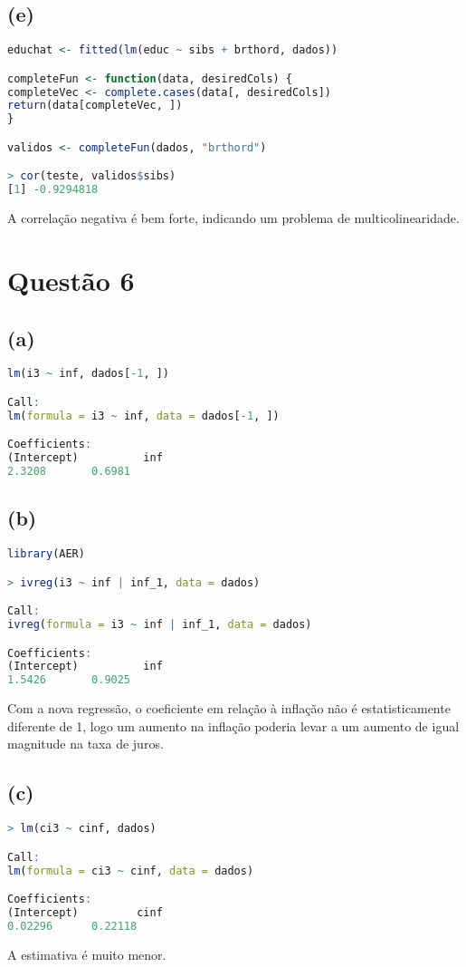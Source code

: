 \documentclass[12pt]{article}
\begin{document}
\subsection*{(e)}
\begin{lstlisting}[language=R]
educhat <- fitted(lm(educ ~ sibs + brthord, dados))

completeFun <- function(data, desiredCols) {
completeVec <- complete.cases(data[, desiredCols])
return(data[completeVec, ])
}

validos <- completeFun(dados, "brthord")

> cor(teste, validos$sibs)
[1] -0.9294818
\end{lstlisting}
A correlação negativa é bem forte, indicando um problema de multicolinearidade.

\section*{Questão 6}

\subsection*{(a)}
\begin{lstlisting}[language=R]
 lm(i3 ~ inf, dados[-1, ])

Call:
lm(formula = i3 ~ inf, data = dados[-1, ])

Coefficients:
(Intercept)          inf  
2.3208       0.6981  
\end{lstlisting}

\subsection*{(b)}
\begin{lstlisting}[language=R]
library(AER)

> ivreg(i3 ~ inf | inf_1, data = dados)

Call:
ivreg(formula = i3 ~ inf | inf_1, data = dados)

Coefficients:
(Intercept)          inf  
1.5426       0.9025  
\end{lstlisting}
Com a nova regressão, o coeficiente em relação à inflação não é estatisticamente diferente de 1, logo um aumento na inflação poderia levar a um aumento de igual magnitude na taxa de juros.

\subsection*{(c)}
\begin{lstlisting}[language=R]
> lm(ci3 ~ cinf, dados)

Call:
lm(formula = ci3 ~ cinf, data = dados)

Coefficients:
(Intercept)         cinf  
0.02296      0.22118 
\end{lstlisting}
A estimativa é muito menor.
\end{document}
